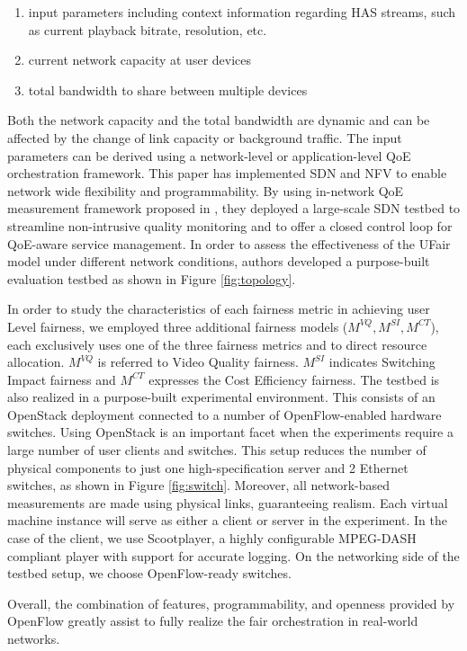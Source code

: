 \documentclass{article}
\begin{document}
\begin{enumerate}
    \item input parameters including context information regarding HAS streams, such as current playback bitrate, resolution, etc.
    \item current network capacity at user devices
    \item total bandwidth to share between multiple devices
\end{enumerate}

Both the network capacity and the total bandwidth are dynamic and can be affected by the change of link capacity or background traffic. The input parameters can be derived using a network-level or application-level QoE orchestration framework. This paper has implemented SDN and NFV to enable network wide flexibility and programmability. By using in-network QoE measurement framework proposed in \cite{Farshad15}, they deployed a large-scale SDN testbed to streamline non-intrusive quality monitoring and to offer a closed control loop for QoE-aware service management. In order to assess the effectiveness of the UFair model under different network conditions, authors developed a purpose-built evaluation testbed as shown in Figure \ref{fig:topology}.

In order to study the characteristics of each fairness metric in achieving user Level fairness, we employed three additional fairness models ($M^{VQ},M^{SI},M^{CT}$), each exclusively uses one of the three fairness metrics and to direct resource allocation. $M^{VQ}$ is referred to Video Quality fairness. $M^{SI}$ indicates Switching Impact fairness and $M^{CT}$ expresses the Cost Efficiency fairness.
The testbed is also realized in a purpose-built experimental environment. This consists of an OpenStack deployment connected to a number of OpenFlow-enabled hardware switches. Using OpenStack is an important facet when the experiments require a large number of user clients and switches. This setup reduces the number of physical components to just one high-specification server and 2 Ethernet switches, as shown in Figure \ref{fig:switch}. Moreover, all network-based measurements are made using physical links, guaranteeing realism. Each virtual machine instance will serve as either a client or server in the experiment. In the case of the client, we use Scootplayer, a highly configurable MPEG-DASH compliant player with support for accurate logging. On the networking side of the testbed setup, we choose OpenFlow-ready switches.

Overall, the combination of features, programmability, and openness provided by OpenFlow greatly assist to fully realize the fair orchestration in real-world networks.
\end{document}
